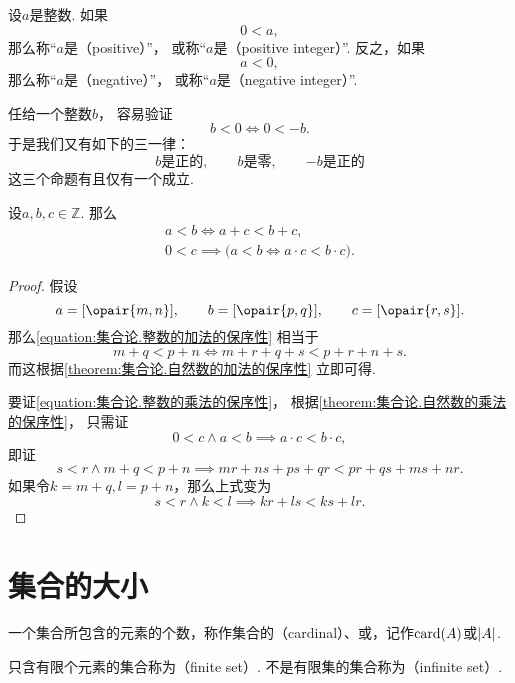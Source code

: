 \begin{definition}
设\(a\)是整数.
如果\[
	0 < a,
\]
那么称“\(a\)是（positive）”，
或称“\(a\)是（positive integer）”.
反之，如果\[
	a < 0,
\]
那么称“\(a\)是（negative）”，
或称“\(a\)是（negative integer）”.
\end{definition}

任给一个整数\(b\)，
容易验证\[
	b < 0 \iff 0 < -b.
\]
于是我们又有如下的三一律：
\[
	\text{\(b\)是正的}, \qquad
	\text{\(b\)是零}, \qquad
	\text{\(-b\)是正的}
\]这三个命题有且仅有一个成立.

\begin{theorem}
设\(a,b,c\in\mathbb{Z}\).
那么\begin{gather}
	a<b \iff a+c<b+c,
	\label{equation:集合论.整数的加法的保序性} \\
	0<c \implies \bigl(
		a<b \iff a \cdot c < b \cdot c
	\bigr).
	\label{equation:集合论.整数的乘法的保序性}
\end{gather}
\begin{proof}
假设\[
	a=[\opair{m,n}], \qquad
	b=[\opair{p,q}], \qquad
	c=[\opair{r,s}].
\]
那么\cref{equation:集合论.整数的加法的保序性} 相当于\[
	m+q<p+n \iff m+r+q+s<p+r+n+s.
\]
而这根据\cref{theorem:集合论.自然数的加法的保序性} 立即可得.

要证\cref{equation:集合论.整数的乘法的保序性}，
根据\cref{theorem:集合论.自然数的乘法的保序性}，
只需证\[
	0<c \land a<b \implies a \cdot c < b \cdot c,
\]
即证\[
	s<r \land m+q<p+n \implies mr+ns+ps+qr<pr+qs+ms+nr.
\]
如果令\(k=m+q, l=p+n\)，那么上式变为\[
	s<r \land k<l \implies kr+ls<ks+lr.
\]
\end{proof}
\end{theorem}


\section{集合的大小}
\begin{definition}
一个集合所包含的元素的个数，称作集合的（cardinal）、或，记作\(\operatorname{card}(A)\)或\(\abs{A}\).
\end{definition}

\begin{definition}
只含有限个元素的集合称为（finite set）.
不是有限集的集合称为（infinite set）.
\end{definition}


